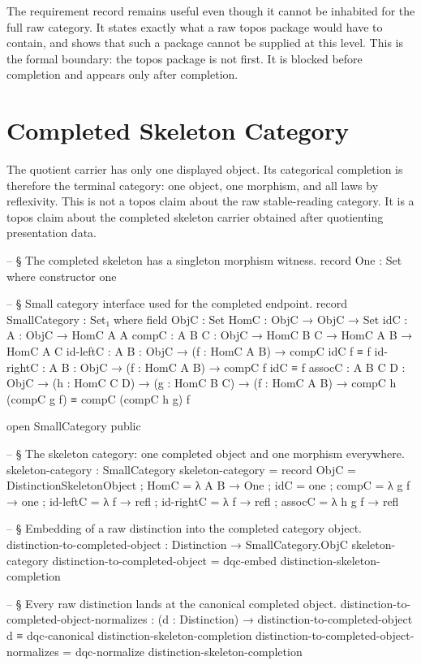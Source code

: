 \documentclass[11pt]{article}
\begin{document}
The requirement record remains useful even though it cannot be inhabited
for the full raw category.  It states exactly what a raw topos package
would have to contain, and
 shows that such a
package cannot be supplied at this level.  This is the formal boundary:
the topos package is not first.  It is blocked before completion and
appears only after completion.

\section{Completed Skeleton Category}

The quotient carrier has only one displayed object.  Its categorical
completion is therefore the terminal category: one object, one morphism,
and all laws by reflexivity.  This is not a topos claim about the raw
stable-reading category.  It is a topos claim about the completed
skeleton carrier obtained after quotienting presentation data.

\begin{code}
-- § The completed skeleton has a singleton morphism witness.
record One : Set where
  constructor one

-- § Small category interface used for the completed endpoint.
record SmallCategory : Set₁ where
  field
    ObjC       : Set
    HomC       : ObjC → ObjC → Set
    idC        : {A : ObjC} → HomC A A
    compC      : {A B C : ObjC} → HomC B C → HomC A B → HomC A C
    id-leftC   : {A B : ObjC} → (f : HomC A B) → compC idC f ≡ f
    id-rightC  : {A B : ObjC} → (f : HomC A B) → compC f idC ≡ f
    assocC     : {A B C D : ObjC} →
                 (h : HomC C D) →
                 (g : HomC B C) →
                 (f : HomC A B) →
                 compC h (compC g f) ≡ compC (compC h g) f

open SmallCategory public

-- § The skeleton category: one completed object and one morphism everywhere.
skeleton-category : SmallCategory
skeleton-category = record
  { ObjC      = DistinctionSkeletonObject
  ; HomC      = λ A B → One
  ; idC       = one
  ; compC     = λ g f → one
  ; id-leftC  = λ f → refl
  ; id-rightC = λ f → refl
  ; assocC    = λ h g f → refl
  }

-- § Embedding of a raw distinction into the completed category object.
distinction-to-completed-object : Distinction → SmallCategory.ObjC skeleton-category
distinction-to-completed-object = dqc-embed distinction-skeleton-completion

-- § Every raw distinction lands at the canonical completed object.
distinction-to-completed-object-normalizes :
  (d : Distinction) →
  distinction-to-completed-object d ≡ dqc-canonical distinction-skeleton-completion
distinction-to-completed-object-normalizes =
  dqc-normalize distinction-skeleton-completion
\end{code}
\end{document}
